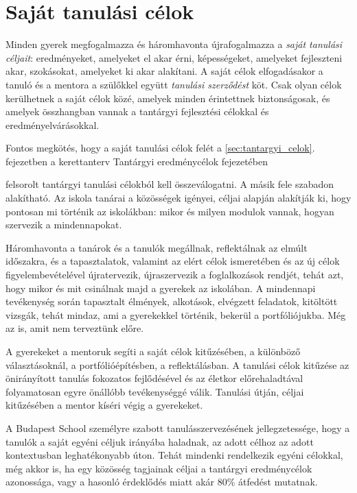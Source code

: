 \section{Saját tanulási célok}

Minden gyerek megfogalmazza és háromhavonta újrafogalmazza a \emph{saját
  tanulási céljait}: eredményeket, amelyeket el akar érni, képességeket,
amelyeket fejleszteni akar, szokásokat, amelyeket ki akar alakítani. A saját
célok elfogadásakor a tanuló és a mentora a szülőkkel együtt \emph{tanulási
  szerződést} köt. Csak olyan célok kerülhetnek a saját célok közé, amelyek
minden érintettnek biztonságosak, és amelyek összhangban vannak a tantárgyi
fejlesztési célokkal és eredményelvárásokkal.

Fontos megkötés, hogy a saját tanulási célok felét a 
\ifkerettanterv
\ref{sec:tantargyi_celok}. fejezetben 
\else
a kerettanterv Tantárgyi eredménycélok fejezetében
\fi

felsorolt tantárgyi tanulási célokból kell összeválogatni. A másik
fele szabadon alakítható. Az iskola tanárai a közösségek igényei, céljai
alapján alakítják ki, hogy pontosan mi történik az iskolákban: mikor és milyen
modulok vannak, hogyan szervezik a mindennapokat.

Háromhavonta a tanárok és a tanulók megállnak, reflektálnak az elmúlt
időszakra, és a tapasztalatok, valamint az elért célok ismeretében és az új
célok figyelembevételével újratervezik, újraszervezik a foglalkozások rendjét,
tehát azt, hogy mikor és mit csinálnak majd a gyerekek az iskolában.
A mindennapi tevékenység során tapasztalt élmények, alkotások, elvégzett
feladatok, kitöltött vizsgák, tehát mindaz, ami a gyerekekkel történik, bekerül
a portfóliójukba. Még az is, amit nem terveztünk előre.

A gyerekeket a mentoruk segíti a saját célok kitűzésében, a különböző
választásoknál, a portfólióépítésben, a reflektálásban. A tanulási célok
kitűzése az önirányított tanulás fokozatos fejlődésével és az életkor
előrehaladtával folyamatosan egyre önállóbb tevékenységgé válik. Tanulási
útján, céljai kitűzésében a mentor kíséri végig a gyerekeket.

A Budapest School személyre szabott tanulásszervezésének jellegzetessége, hogy
a tanulók a saját egyéni céljuk irányába haladnak, az adott célhoz az adott
kontextusban leghatékonyabb úton. Tehát mindenki rendelkezik egyéni célokkal,
még akkor is, ha egy közösség tagjainak céljai a tantárgyi eredménycélok
azonossága, vagy a hasonló érdeklődés miatt akár  80\% átfedést mutatnak.

